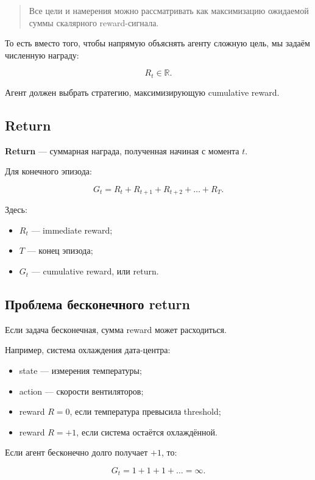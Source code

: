 \documentclass[a4paper,12pt]{article}
\begin{document}
\begin{quote}
Все цели и намерения можно рассматривать как максимизацию ожидаемой суммы скалярного reward-сигнала.
\end{quote}

То есть вместо того, чтобы напрямую объяснять агенту сложную цель, мы задаём численную награду:

\[
R_t \in \mathbb{R}.
\]

Агент должен выбрать стратегию, максимизирующую cumulative reward.

\subsection{Return}

\textbf{Return} --- суммарная награда, полученная начиная с момента \(t\).

Для конечного эпизода:

\[
G_t
=
R_t + R_{t+1} + R_{t+2} + \dots + R_T.
\]

Здесь:

\begin{itemize}
    \item \(R_t\) --- immediate reward;
    \item \(T\) --- конец эпизода;
    \item \(G_t\) --- cumulative reward, или return.
\end{itemize}

\subsection{Проблема бесконечного return}

Если задача бесконечная, сумма reward может расходиться.

Например, система охлаждения дата-центра:

\begin{itemize}
    \item state --- измерения температуры;
    \item action --- скорости вентиляторов;
    \item reward \(R=0\), если температура превысила threshold;
    \item reward \(R=+1\), если система остаётся охлаждённой.
\end{itemize}

Если агент бесконечно долго получает \(+1\), то:

\[
G_t = 1 + 1 + 1 + \dots = \infty.
\]
\end{document}
